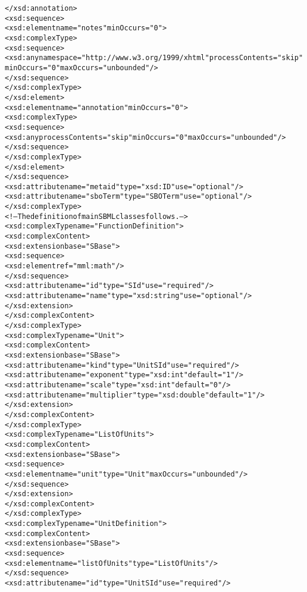 \begin{alltt}
        </xsd:annotation>
        <xsd:sequence>
            <xsd:element name="notes" minOccurs="0">
                <xsd:complexType>
                    <xsd:sequence>
                        <xsd:any namespace="http://www.w3.org/1999/xhtml" processContents="skip"
                            minOccurs="0" maxOccurs="unbounded"/>
                    </xsd:sequence>
                </xsd:complexType>
            </xsd:element>
            <xsd:element name="annotation" minOccurs="0">
                <xsd:complexType>
                    <xsd:sequence>
                        <xsd:any processContents="skip" minOccurs="0" maxOccurs="unbounded"/>
                    </xsd:sequence>
                </xsd:complexType>
            </xsd:element>
        </xsd:sequence>
        <xsd:attribute name="metaid" type="xsd:ID" use="optional"/>
        <xsd:attribute name="sboTerm" type="SBOTerm" use="optional"/>
    </xsd:complexType>
    <!--The definition of main SBML classes follows.-->
    <xsd:complexType name="FunctionDefinition">
        <xsd:complexContent>
            <xsd:extension base="SBase">
                <xsd:sequence>
                    <xsd:element ref="mml:math"/>
                </xsd:sequence>
                <xsd:attribute name="id" type="SId" use="required"/>
                <xsd:attribute name="name" type="xsd:string" use="optional"/>
            </xsd:extension>
        </xsd:complexContent>
    </xsd:complexType>
    <xsd:complexType name="Unit">
        <xsd:complexContent>
            <xsd:extension base="SBase">
                <xsd:attribute name="kind" type="UnitSId" use="required"/>
                <xsd:attribute name="exponent" type="xsd:int" default="1"/>
                <xsd:attribute name="scale" type="xsd:int" default="0"/>
                <xsd:attribute name="multiplier" type="xsd:double" default="1"/>
            </xsd:extension>
        </xsd:complexContent>
    </xsd:complexType>
    <xsd:complexType name="ListOfUnits">
        <xsd:complexContent>
            <xsd:extension base="SBase">
                <xsd:sequence>
                    <xsd:element name="unit" type="Unit" maxOccurs="unbounded"/>
                </xsd:sequence>
            </xsd:extension>
        </xsd:complexContent>
    </xsd:complexType>
    <xsd:complexType name="UnitDefinition">
        <xsd:complexContent>
            <xsd:extension base="SBase">
                <xsd:sequence>
                    <xsd:element name="listOfUnits" type="ListOfUnits"/>
                </xsd:sequence>
                <xsd:attribute name="id" type="UnitSId" use="required"/>

\end{alltt}
